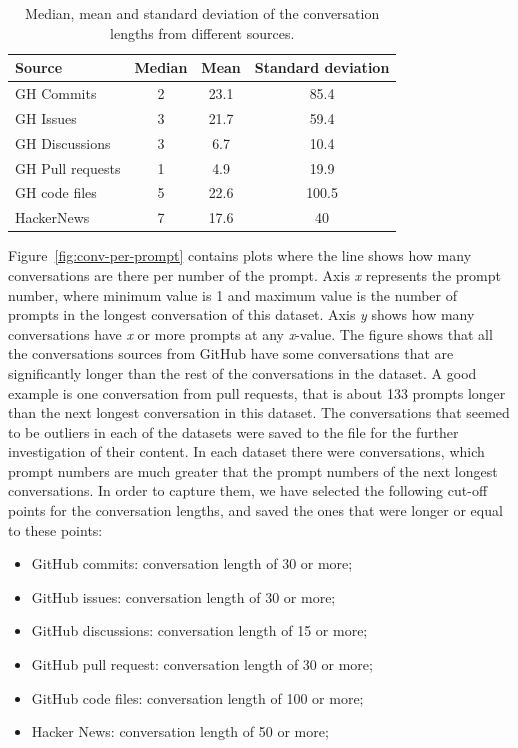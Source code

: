 \begin{table}[H]
\centering
\begin{tabular}{l||c|c|c}
Source           & Median & Mean & Standard deviation \\ \hline
GH Commits       & 2      & 23.1 & 85.4               \\
GH Issues        & 3      & 21.7 & 59.4              \\
GH Discussions   & 3      & 6.7  & 10.4               \\
GH Pull requests & 1      & 4.9  & 19.9               \\
GH code files    & 5      & 22.6 & 100.5              \\
HackerNews       & 7      & 17.6 & 40              
\end{tabular}   
\caption{Median, mean and standard deviation of the conversation lengths from different sources.}
\label{table:conv-lengths} 
\end{table}

Figure~\ref{fig:conv-per-prompt} contains plots where the line shows how many conversations are there per number of the prompt. Axis \textit{x} represents the prompt number, where minimum value is 1 and maximum value is the number of prompts in the longest conversation of this dataset. Axis \textit{y} shows how many conversations have \textit{x} or more prompts at any \textit{x}-value. The figure shows that all the conversations sources from GitHub have some conversations that are significantly longer than the rest of the conversations in the dataset. A good example is one conversation from pull requests, that is about 133 prompts longer than the next longest conversation in this dataset. The conversations that seemed to be outliers in each of the datasets were saved to the file for the further investigation of their content. In each dataset there were conversations, which prompt numbers are much greater that the prompt numbers of the next longest conversations. In order to capture them, we have selected the following cut-off points for the conversation lengths, and saved the ones that were longer or equal to these points: 
\begin{itemize}
    \item GitHub commits: conversation length of 30 or more;
    \item GitHub issues: conversation length of 30 or more;
    \item GitHub discussions: conversation length of 15 or more;
    \item GitHub pull request: conversation length of 30 or more;
    \item GitHub code files: conversation length of 100 or more;
    \item Hacker News: conversation length of 50 or more;
\end{itemize}

